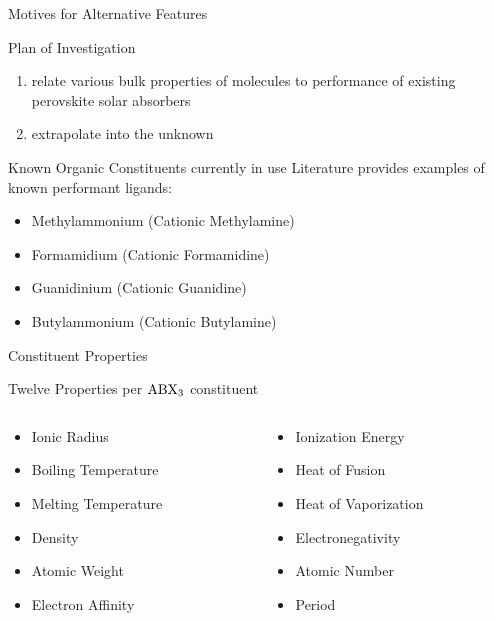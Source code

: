 \documentclass[10pt, aspectratio=169, presentation]{beamer}
\begin{document}
\begin{frame}[label={sec:org063973e}]{Motives for Alternative Features}
\begin{block}{Plan of Investigation}
\begin{enumerate}
\item relate various bulk properties of molecules to performance of
existing perovskite solar absorbers
\item extrapolate into the unknown
\end{enumerate}
\end{block}
\begin{block}{Known Organic Constituents currently in use}
Literature provides examples of known performant ligands:
\begin{itemize}
\item Methylammonium (Cationic Methylamine)
\autocite{yan-2016-defec-physic}
\item Formamidium (Cationic Formamidine)
\autocite{dimesso-2016-inves-formam}
\item Guanidinium (Cationic Guanidine)
\autocite{zhang-2019-perov-photov}
\item Butylammonium (Cationic Butylamine)
\autocite{hong-2021-layer-edge}
\end{itemize}
\end{block}
\end{frame}

\begin{frame}[label={sec:org61d4bbe}]{Constituent Properties}
\begin{block}{Twelve Properties per \(\ce{ABX_3}\) constituent}
\begin{columns}
\begin{column}{0.5\columnwidth}
\begin{itemize}
\item Ionic Radius
\item Boiling Temperature
\item Melting Temperature
\item Density
\item Atomic Weight
\item Electron Affinity
\end{itemize}
\end{column}
\begin{column}{0.5\columnwidth}
\begin{itemize}
\item Ionization Energy
\item Heat of Fusion
\item Heat of Vaporization
\item Electronegativity
\item Atomic Number
\item Period
\end{itemize}
\end{column}
\end{columns}
\end{block}
\end{frame}
\end{document}
